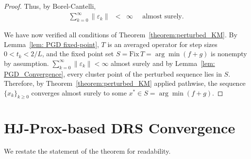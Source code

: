 \documentclass{article}
\newcommand{\amp}{\mathop{\:\:\,}\nolimits}
\theoremstyle{plain}
\theoremstyle{definition}
\theoremstyle{remark}
\begin{document}
\begin{proof}
Thus, by Borel-Cantelli, 
\begin{eqnarray}
\sum_{k=0}^\infty \|\varepsilon_k\| &<& \infty \amp \text{almost surely}.
\end{eqnarray}

We have now verified all conditions of Theorem~\ref{theorem:perturbed_KM}. By Lemma~\ref{lem: PGD fixed-point}, $T$ is an averaged operator for step sizes $0 < t_k < 2/L$, and the fixed point set $S = \mathrm{Fix}\, T = \arg\min(f+g)$ is nonempty by assumption. $\sum_{k=0}^\infty \|\varepsilon_k\| < \infty$ almost surely and by Lemma~\ref{lem: PGD_Convergence}, every cluster point of the perturbed sequence lies in $S$. Therefore, by Theorem~\ref{theorem:perturbed_KM} applied pathwise, the sequence $\{\hat{x}_k\}_{k\geq 0}$ converges almost surely to some $x^* \in S = \arg\min(f+g)$.
\end{proof}

\section{HJ-Prox-based DRS Convergence}
We restate the statement of the theorem for readability.
\end{document}
